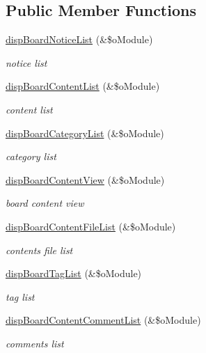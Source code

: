 \subsection*{Public Member Functions}
\begin{DoxyCompactItemize}
\item 
\hyperlink{classboardAPI_a18395a2be76383d74317c1fcc1fb5830}{disp\+Board\+Notice\+List} (\&\$o\+Module)
\begin{DoxyCompactList}\small\item\em notice list \end{DoxyCompactList}\item 
\hyperlink{classboardAPI_a7002a8159c34d85b969647c04f3baaa3}{disp\+Board\+Content\+List} (\&\$o\+Module)
\begin{DoxyCompactList}\small\item\em content list \end{DoxyCompactList}\item 
\hyperlink{classboardAPI_aa527b1afc48bacd728b5d95e969a60f6}{disp\+Board\+Category\+List} (\&\$o\+Module)
\begin{DoxyCompactList}\small\item\em category list \end{DoxyCompactList}\item 
\hyperlink{classboardAPI_aeaa451d5556251f9d148350b34d0481a}{disp\+Board\+Content\+View} (\&\$o\+Module)
\begin{DoxyCompactList}\small\item\em board content view \end{DoxyCompactList}\item 
\hyperlink{classboardAPI_a38441526c56c77613bb6681cf5c927d5}{disp\+Board\+Content\+File\+List} (\&\$o\+Module)
\begin{DoxyCompactList}\small\item\em contents file list \end{DoxyCompactList}\item 
\hyperlink{classboardAPI_af31d812495ea03d7a81c836463a56cad}{disp\+Board\+Tag\+List} (\&\$o\+Module)
\begin{DoxyCompactList}\small\item\em tag list \end{DoxyCompactList}\item 
\hyperlink{classboardAPI_af5b1506259e5aaec1b6f743ac6548203}{disp\+Board\+Content\+Comment\+List} (\&\$o\+Module)
\begin{DoxyCompactList}\small\item\em comments list \end{DoxyCompactList}\item 

\end{DoxyCompactItemize}
